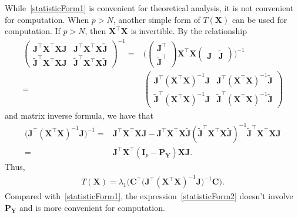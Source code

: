 \documentclass[12pt]{article} %
\newcommand{\bA}{\mathbf{A}}
\newcommand{\bX}{\mathbf{X}}
\newcommand{\bP}{\mathbf{P}}
\newcommand{\bY}{\mathbf{Y}}
\newcommand{\bJ}{\mathbf{J}}
\newcommand{\bC}{\mathbf{C}}
\newcommand{\bI}{\mathbf{I}}
\theoremstyle{definition}
\begin{document}
While~\eqref{statisticForm1} is convenient for theoretical analysis, it is not convenient for computation.
When $p>N$, another simple form of $T(\bX)$ can be used for computation.
If $p>N$, then $\bX^\top \bX$ is invertible.
By the relationship
\begin{equation*}
    \begin{aligned}
        \begin{pmatrix}
            \bJ^\top \bX^\top \bX\bJ & \bJ^\top \bX^\top \bX\tilde{\bJ}\\
            \tilde{\bJ}^\top \bX^\top \bX \bJ & \tilde{\bJ}^\top \bX^\top \bX \tilde{\bJ}
        \end{pmatrix}^{-1}
        =&
        \Big(
        \begin{pmatrix}
            \bJ^\top\\
            \tilde{\bJ}^\top
        \end{pmatrix}
        \bX^\top \bX
        \begin{pmatrix}
            \bJ &\tilde{\bJ}
        \end{pmatrix}
        \Big)^{-1}
        \\
        =&
        \begin{pmatrix}
            \bJ^\top {(\bX^\top \bX)}^{-1}\bJ & \bJ^\top {(\bX^\top \bX)}^{-1}\tilde{\bJ}\\
            \tilde{\bJ}^\top {(\bX^\top \bX)}^{-1}\bJ & \tilde{\bJ}^\top {(\bX^\top \bX)}^{-1} \tilde{\bJ}
        \end{pmatrix}
    \end{aligned}
\end{equation*}
and matrix inverse formula, we have that
\begin{equation*}
    \begin{aligned}
        \big( \bJ^\top {(\bX^\top \bX)}^{-1}\bJ \big)^{-1}
        =&\bJ^\top \bX^\top \bX \bJ - \bJ^\top \bX^\top \bX\tilde{\bJ}{(\tilde{\bJ}^\top \bX^\top \bX \tilde{\bJ})}^{-1}
            \tilde{\bJ}^\top \bX^\top \bX\bJ 
            \\
        =& \bJ^\top \bX^\top( \bI_p- \bP_{\bY}) \bX \bJ.
    \end{aligned}
\end{equation*}
Thus, 
\begin{equation}\label{statisticForm2}
    \begin{aligned}
        T(\bX)=
        \lambda_1 \Big(\bC^\top\big( \bJ^\top (\bX^\top \bX)^{-1}\bJ \big)^{-1}\bC\Big).
    \end{aligned}
\end{equation}
Compared with~\eqref{statisticForm1}, the expression~\eqref{statisticForm2} doesn't involve $\bP_{\bY}$ and is more convenient for computation.
\end{document}
